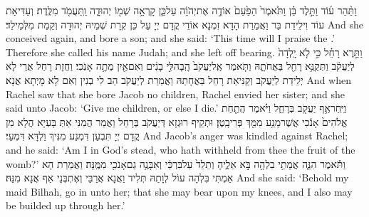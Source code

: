 {וַתַּ֨הַר ע֜וֹד וַתֵּ֣לֶד בֵּ֗ן וַתֹּ֙אמֶר֙ הַפַּ֙עַם֙ אוֹדֶ֣ה אֶת\maqqaf יְהֹוָ֔ה עַל\maqqaf כֵּ֛ן קָרְאָ֥ה שְׁמ֖וֹ יְהוּדָ֑ה וַֽתַּעֲמֹ֖ד מִלֶּֽדֶת׃}
{וְעַדִּיאַת עוֹד וִילֵידַת בַּר וַאֲמַרַת הָדָא זִמְנָא אוֹדֵי קֳדָם יְיָ עַל כֵּן קְרָת שְׁמֵיהּ יְהוּדָה וְקַמַת מִלְּמֵילַד׃}
{And she conceived again, and bore a son; and she said: ‘This time will I praise the \lord.’ Therefore she called his name Judah; and she left off bearing.}{}
\newperek
{}%
{וַתֵּ֣רֶא רָחֵ֗ל כִּ֣י לֹ֤א יָֽלְדָה֙ לְיַעֲקֹ֔ב וַתְּקַנֵּ֥א רָחֵ֖ל בַּאֲחֹתָ֑הּ וַתֹּ֤אמֶר אֶֽל\maqqaf יַעֲקֹב֙ הָֽבָה\maqqaf לִּ֣י בָנִ֔ים וְאִם\maqqaf אַ֖יִן מֵתָ֥ה אָנֹֽכִי׃}
{וַחֲזָת רָחֵל אֲרֵי לָא יְלֵידַת לְיַעֲקֹב וְקַנִּיאַת רָחֵל בַּאֲחָתַהּ וַאֲמַרַת לְיַעֲקֹב הַב לִי בְנִין וְאִם לָא מָיְתָא אֲנָא׃}
{And when Rachel saw that she bore Jacob no children, Rachel envied her sister; and she said unto Jacob: ‘Give me children, or else I die.’}{}
{וַיִּֽחַר\maqqaf אַ֥ף יַעֲקֹ֖ב בְּרָחֵ֑ל וַיֹּ֗אמֶר הֲתַ֤חַת אֱלֹהִים֙ אָנֹ֔כִי אֲשֶׁר\maqqaf מָנַ֥ע מִמֵּ֖ךְ פְּרִי\maqqaf בָֽטֶן׃}
{וּתְקֵיף רוּגְזָא דְּיַעֲקֹב בְּרָחֵל וַאֲמַר הֲמִנִּי אַתְּ בָּעְיָא הֲלָא מִן קֳדָם יְיָ תִּבְעַן דִּמְנַע מִנִּיךְ וַלְדָּא דִּמְעֵי׃}
{And Jacob’s anger was kindled against Rachel; and he said: ‘Am I in God’s stead, who hath withheld from thee the fruit of the womb?’}{}
{וַתֹּ֕אמֶר הִנֵּ֛ה אֲמָתִ֥י בִלְהָ֖ה בֹּ֣א אֵלֶ֑יהָ וְתֵלֵד֙ עַל\maqqaf בִּרְכַּ֔י וְאִבָּנֶ֥ה גַם\maqqaf אָנֹכִ֖י מִמֶּֽנָּה׃}
{וַאֲמַרַת הָא אַמְתִּי בִּלְהָה עוֹל לְוָתַהּ תְּלִיד וַאֲנָא אֲרַבֵּי וְאֶתְבְּנֵי אַף אֲנָא מִנַּהּ׃}
{And she said: ‘Behold my maid Bilhah, go in unto her; that she may bear upon my knees, and I also may be builded up through her.’}{}
